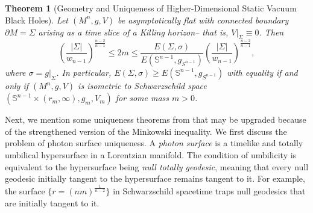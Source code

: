 \documentclass[12pt,twoside]{article}
\theoremstyle{plain}
\newtheorem{theorem}{Theorem}[section]
\theoremstyle{definition}
\theoremstyle{remark}
\newtheorem*{remark}{Remark}
\numberwithin{equation}{section}
\begin{document}
\begin{theorem}[Geometry and Uniqueness of Higher-Dimensional Static Vacuum Black Holes] \label{black_hole_uniqueness} 
Let $(M^{n},g,V)$ be asymptotically flat  with connected boundary $\partial M= \Sigma$ arising as a time slice of a Killing horizon-- that is, $V|_{\Sigma} \equiv 0$. Then
\begin{equation} \label{bh_bounds}
\left( \frac{|\Sigma|}{w_{n-1}} \right)^{\frac{n-2}{n-1}} \leq 2m \leq \frac{E(\Sigma,\sigma)}{E(\mathbb{S}^{n-1},g_{S^{n-1}})} \left( \frac{|\Sigma|}{w_{n-1}} \right)^{\frac{n-2}{n-1}},
\end{equation}
where $\sigma=g|_{\Sigma}$. In particular, $E(\Sigma,\sigma) \geq E(\mathbb{S}^{n-1},g_{S^{n-1}})$ with equality if and only if $(M^{n},g,V)$ is isometric to Schwarzschild space $(\mathbb{S}^{n-1} \times (r_{m},\infty), g_{m},V_{m})$ for some mass $m >0$.
\end{theorem}


Next, we mention some uniqueness theorems from \cite{HW} that may be upgraded because of the strengthened version of the Minkowski inequality. We first discuss the problem of photon surface uniqueness. A \textit{photon surface} is a timelike and totally umbilical hypersurface in a Lorentzian manifold. The condition of umbilicity is equivalent to the hypersurface being \textit{null totally geodesic}, meaning that every null geodesic initially tangent to the hypersurface remains tangent to it. For example, the surface $\{ r = (nm)^{\frac{1}{n-2}} \}$ in Schwarzschild spacetime traps null geodesics that are initially tangent to it. 
\end{document}
